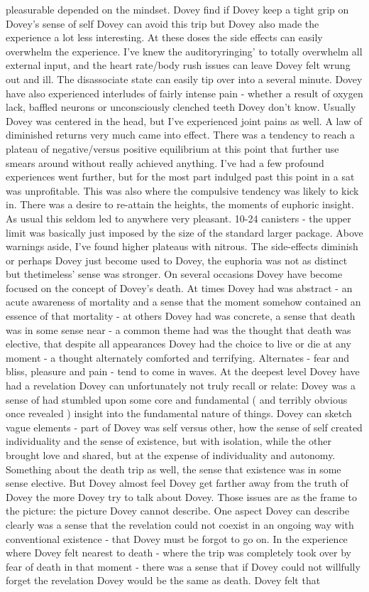 \documentclass[12pt]{book}
\begin{document}
pleasurable depended on the mindset. Dovey find if Dovey keep a tight grip on Dovey's sense of self Dovey can avoid this trip but Dovey also made the experience a lot less interesting. At these doses the side effects can easily overwhelm the experience. I've knew the auditoryringing' to totally overwhelm all external input, and the heart rate/body rush issues can leave Dovey felt wrung out and ill. The disassociate state can easily tip over into a several minute. Dovey have also experienced interludes of fairly intense pain - whether a result of oxygen lack, baffled neurons or unconsciously clenched teeth Dovey don't know. Usually Dovey was centered in the head, but I've experienced joint pains as well. A law of diminished returns very much came into effect. There was a tendency to reach a plateau of negative/versus positive equilibrium at this point that further use smears around without really achieved anything. I've had a few profound experiences went further, but for the most part indulged past this point in a sat was unprofitable. This was also where the compulsive tendency was likely to kick in. There was a desire to re-attain the heights, the moments of euphoric insight. As usual this seldom led to anywhere very pleasant. 10-24 canisters - the upper limit was basically just imposed by the size of the standard larger package. Above warnings aside, I've found higher plateaus with nitrous. The side-effects diminish or perhaps Dovey just become used to Dovey, the euphoria was not as distinct but thetimeless' sense was stronger. On several occasions Dovey have become focused on the concept of Dovey's death. At times Dovey had was abstract - an acute awareness of mortality and a sense that the moment somehow contained an essence of that mortality - at others Dovey had was concrete, a sense that death was in some sense near - a common theme had was the thought that death was elective, that despite all appearances Dovey had the choice to live or die at any moment - a thought alternately comforted and terrifying. Alternates - fear and bliss, pleasure and pain - tend to come in waves. At the deepest level Dovey have had a revelation Dovey can unfortunately not truly recall or relate: Dovey was a sense of had stumbled upon some core and fundamental ( and terribly obvious once revealed ) insight into the fundamental nature of things. Dovey can sketch vague elements - part of Dovey was self versus other, how the sense of self created individuality and the sense of existence, but with isolation, while the other brought love and shared, but at the expense of individuality and autonomy. Something about the death trip as well, the sense that existence was in some sense elective. But Dovey almost feel Dovey get farther away from the truth of Dovey the more Dovey try to talk about Dovey. Those issues are as the frame to the picture: the picture Dovey cannot describe. One aspect Dovey can describe clearly was a sense that the revelation could not coexist in an ongoing way with conventional existence - that Dovey must be forgot to go on. In the experience where Dovey felt nearest to death - where the trip was completely took over by fear of death in that moment - there was a sense that if Dovey could not willfully forget the revelation Dovey would be the same as death. Dovey felt that 
\end{document}

